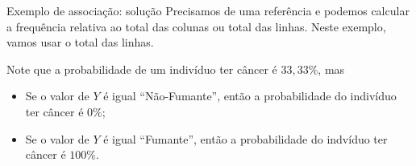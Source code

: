 \documentclass[9pt]{beamer}
\begin{document}
\begin{frame}{Exemplo de associação: solução}
Precisamos de uma referência e podemos calcular a frequência relativa ao total das colunas ou total das linhas. Neste exemplo, vamos usar o total das linhas.
\begin{table}[htbp]
	\centering
	\caption{Tabela de contingência com frequência relativa ao total das linhas.}
	\label{tab:associacao_rel}
\end{table} 

Note que a probabilidade de um indivíduo ter câncer é {\color{red} $33,33\%$}, mas
\begin{itemize}
	\item Se o valor de $Y$ é igual ``Não-Fumante'', então a probabilidade do indivíduo ter câncer é {\color{brown} $0\%$};
	\item Se o valor de $Y$ é igual ``Fumante'', então a probabilidade do indvíduo ter câncer é {\color{blue} $100\%$}.
\end{itemize}

\end{frame}
\end{document}
